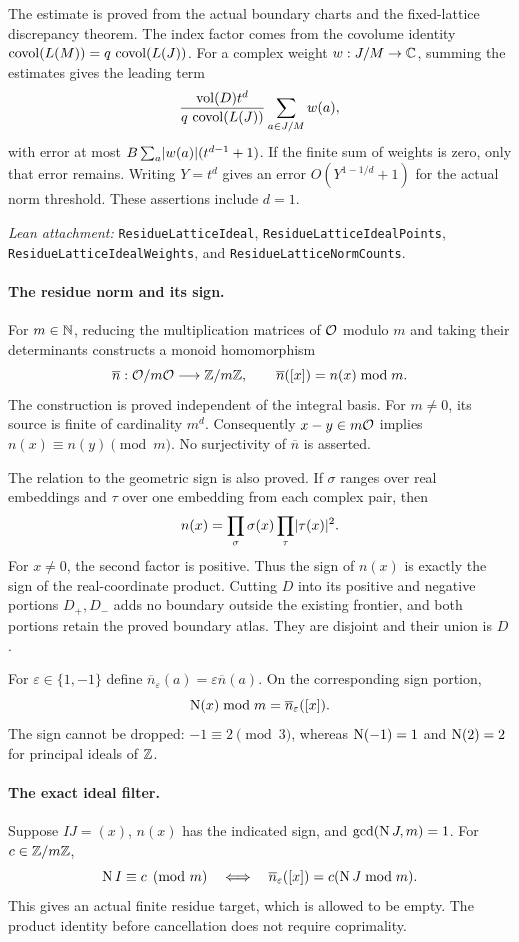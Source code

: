 The estimate is proved from the actual boundary charts and the fixed-lattice
discrepancy theorem. The index factor comes from the covolume identity
$\operatorname{covol}(L(M))=q\,\operatorname{covol}(L(J))$.
For a complex weight $w:J/M\to\mathbb C$, summing the estimates gives the leading
term
\[
 \frac{\operatorname{vol}(D)t^d}{q\,\operatorname{covol}(L(J))}\sum_{a\in J/M}w(a),
\]
with error at most $B\sum_a\lvert w(a)\rvert(t^{d-1}+1)$.
If the finite sum of weights is zero, only that error remains.
Writing $Y=t^d$ gives an error $O(Y^{1-1/d}+1)$ for the actual norm threshold.
These assertions include $d=1$.

\smallskip
\noindent\emph{Lean attachment:}
\nolinkurl{ResidueLatticeIdeal}, \nolinkurl{ResidueLatticeIdealPoints},
\nolinkurl{ResidueLatticeIdealWeights}, and \nolinkurl{ResidueLatticeNormCounts}.

\newpage
\paragraph{The residue norm and its sign.}
For $m\in\mathbb N$, reducing the multiplication matrices of $\mathcal O$ modulo $m$
and taking their determinants constructs a monoid homomorphism
\[
 \overline n:\mathcal O/m\mathcal O\longrightarrow\mathbb Z/m\mathbb Z,
 \qquad \overline n([x])=n(x)\bmod m.
\]
The construction is proved independent of the integral basis.
For $m\ne0$, its source is finite of cardinality $m^d$.
Consequently $x-y\in m\mathcal O$ implies $n(x)\equiv n(y)\pmod m$.
No surjectivity of $\overline n$ is asserted.

The relation to the geometric sign is also proved. If $\sigma$ ranges over
real embeddings and $\tau$ over one embedding from each complex pair, then
\[
 n(x)=\prod_{\sigma}\sigma(x)\prod_{\tau}\lvert \tau(x)\rvert^2.
\]
For $x\ne0$, the second factor is positive. Thus the sign of $n(x)$ is
exactly the sign of the real-coordinate product. Cutting $D$ into its
positive and negative portions $D_+,D_-$ adds no boundary outside the
existing frontier, and both portions retain the proved boundary atlas.
They are disjoint and their union is $D$.

For $\varepsilon\in\{1,-1\}$ define
$\overline n_{\varepsilon}(a)=\varepsilon\overline n(a)$.
On the corresponding sign portion,
\[
 \operatorname N(x)\bmod m=\overline n_{\varepsilon}([x]).
\]
The sign cannot be dropped: $-1\equiv2\pmod3$, whereas
$\operatorname N(-1)=1$ and $\operatorname N(2)=2$ for principal ideals of $\mathbb Z$.

\paragraph{The exact ideal filter.}
Suppose $IJ=(x)$, $n(x)$ has the indicated sign, and
$\gcd(\operatorname N J,m)=1$. For $c\in\mathbb Z/m\mathbb Z$,
\[
 \operatorname N I\equiv c\pmod m
 \quad\Longleftrightarrow\quad
 \overline n_{\varepsilon}([x])=c(\operatorname N J\bmod m).
\]
This gives an actual finite residue target, which is allowed to be empty.
The product identity before cancellation does not require coprimality.

